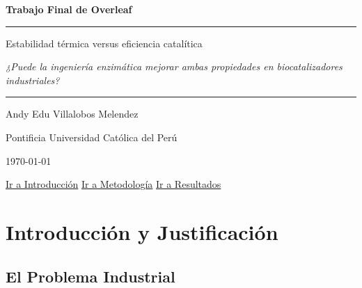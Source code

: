 \begin{titlepage}
    \centering
    \thispagestyle{empty}

    \vspace*{2.0cm}

    {\LARGE\bfseries Trabajo Final de Overleaf\par}

    \vspace{0.6cm}
    \rule{0.75\textwidth}{0.6pt}
    \vspace{1.2cm}

    {\Large Estabilidad térmica versus eficiencia catalítica\par}

    \vspace{0.45cm}

    {\large\itshape
    ¿Puede la ingeniería enzimática mejorar ambas propiedades
    en biocatalizadores industriales?\par}

    \vspace{1.2cm}
    \rule{0.55\textwidth}{0.4pt}

    \vfill

    {\large Andy Edu Villalobos Melendez\par}
    \vspace{0.35cm}
    {\large Pontificia Universidad Católica del Perú\par}
    \vspace{1.2cm}
    {\large \today\par}

    \vspace*{1.2cm}
\end{titlepage}

\tableofcontents

\vspace{0.5cm}

\noindent
\hyperref[sec:introduccion]{Ir a Introducción}
\hfill
\hyperref[sec:metodologia]{Ir a Metodología}
\hfill
\hyperref[sec:evidencia]{Ir a Resultados}

\newpage

\section{Introducción y Justificación}
\label{sec:introduccion}

\subsection{El Problema Industrial}
\label{subsec:problema_industrial}

